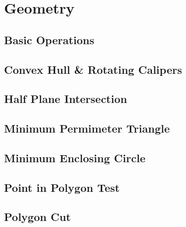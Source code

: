 \documentclass[9pt,landscape,a4paper,twocolumn]{extarticle}
\begin{document}
\section{Geometry}

\subsection{Basic Operations}


% 

\subsection{Convex Hull \& Rotating Calipers}


\subsection{Half Plane Intersection}


\subsection{Minimum Permimeter Triangle}


\subsection{Minimum Enclosing Circle}


\subsection{Point in Polygon Test}


\subsection{Polygon Cut}

\end{document}
